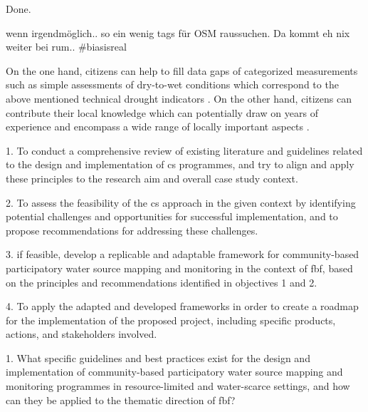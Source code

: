 Done.


wenn irgendmöglich.. so ein wenig tags für OSM raussuchen. Da kommt eh nix weiter bei rum.. #biasisreal








On the one hand, citizens can help to fill data gaps of categorized measurements such as simple assessments of dry-to-wet conditions which correspond to the above mentioned technical drought indicators \autocite{lackstromBackyardHydroclimatologyCitizen2022}. On the other hand, citizens can contribute their local knowledge which can potentially draw on years of experience and encompass a wide range of locally important aspects \autocite{butteFrameworkWaterSecurity2022,koehlerCitizenParticipationCollaborative2008,njambi-szlapkaIntegratingCommunityVoices}.




















1. To conduct a comprehensive review of existing literature and guidelines related to the design and implementation of \acrlong{cs} programmes, and try to align and apply these principles to the research aim and overall case study context.

2. To assess the feasibility of the \acrlong{cs} approach in the given context by identifying potential challenges and opportunities for successful implementation, and to propose recommendations for addressing these challenges.

3. if feasible, develop a replicable and adaptable framework for community-based participatory water source mapping and monitoring in the context of \acrlong{fbf}, based on the principles and recommendations identified in objectives 1 and 2.

4. To apply the adapted and developed frameworks in order to create a roadmap for the implementation of the proposed project, including specific products, actions, and stakeholders involved.

1. What specific guidelines and best practices exist for the design and implementation of community-based participatory water source mapping and monitoring programmes in resource-limited and water-scarce settings, and how can they be applied to the thematic direction of \acrlong{fbf}? %

